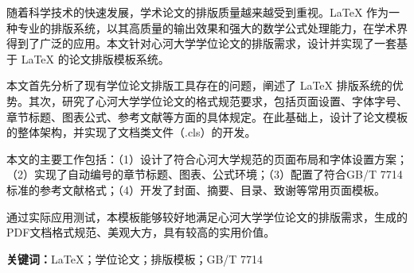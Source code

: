 
\begin{cabstractpage}

随着科学技术的快速发展，学术论文的排版质量越来越受到重视。LaTeX 作为一种专业的排版系统，以其高质量的输出效果和强大的数学公式处理能力，在学术界得到了广泛的应用。本文针对心河大学学位论文的排版需求，设计并实现了一套基于 LaTeX 的论文排版模板系统。

本文首先分析了现有学位论文排版工具存在的问题，阐述了 LaTeX 排版系统的优势。其次，研究了心河大学学位论文的格式规范要求，包括页面设置、字体字号、章节标题、图表公式、参考文献等方面的具体规定。在此基础上，设计了论文模板的整体架构，并实现了文档类文件（.cls）的开发。

本文的主要工作包括：（1）设计了符合心河大学规范的页面布局和字体设置方案；（2）实现了自动编号的章节标题、图表、公式环境；（3）配置了符合GB/T 7714标准的参考文献格式；（4）开发了封面、摘要、目录、致谢等常用页面模板。

通过实际应用测试，本模板能够较好地满足心河大学学位论文的排版需求，生成的PDF文档格式规范、美观大方，具有较高的实用价值。

\vspace{\baselineskip}

\noindent\hspace*{2\ccwd}%
{\textbf{关键词：}LaTeX；学位论文；排版模板；GB/T 7714}

\end{cabstractpage}

